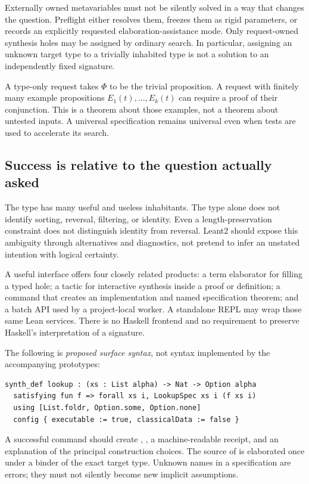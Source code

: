 \documentclass[11pt,letterpaper]{article}
\newcommand{\code}[1]{\texttt{\detokenize{#1}}}
\theoremstyle{definition}
\theoremstyle{remark}
\begin{document}
Externally owned metavariables must not be silently solved in a way that changes the question. Preflight either resolves them, freezes them as rigid parameters, or records an explicitly requested elaboration-assistance mode. Only request-owned synthesis holes may be assigned by ordinary search. In particular, assigning an unknown target type to a trivially inhabited type is not a solution to an independently fixed signature.

A type-only request takes $\Phi$ to be the trivial proposition. A request with finitely many example propositions $E_1(t),\ldots,E_k(t)$ can require a proof of their conjunction. This is a theorem about those examples, not a theorem about untested inputs. A universal specification remains universal even when tests are used to accelerate its search.

\subsection{Success is relative to the question actually asked}

The type \code{List Nat -> List Nat} has many useful and useless inhabitants. The type alone does not identify sorting, reversal, filtering, or identity. Even a length-preservation constraint does not distinguish identity from reversal. Leant2 should expose this ambiguity through alternatives and diagnostics, not pretend to infer an unstated intention with logical certainty.

A useful interface offers four closely related products: a term elaborator for filling a typed hole; a tactic for interactive synthesis inside a proof or definition; a command that creates an implementation and named specification theorem; and a batch API used by a project-local worker. A standalone REPL may wrap those same Lean services. There is no Haskell frontend and no requirement to preserve Haskell's interpretation of a signature.

The following is \emph{proposed surface syntax}, not syntax implemented by the accompanying prototypes:
\Needspace{106pt}
\begin{lstlisting}
synth_def lookup : (xs : List alpha) -> Nat -> Option alpha
  satisfying fun f => forall xs i, LookupSpec xs i (f xs i)
  using [List.foldr, Option.some, Option.none]
  config { executable := true, classicalData := false }
\end{lstlisting}
A successful command should create \code{lookup}, \code{lookup_spec}, a machine-readable receipt, and an explanation of the principal construction choices. The source of \code{LookupSpec} is elaborated once under a binder of the exact target type. Unknown names in a specification are errors; they must not silently become new implicit assumptions.
\end{document}
